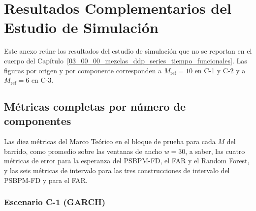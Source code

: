 \chapter{Resultados Complementarios del Estudio de Simulación}
\label{aneB_00_00_resultados_simulacion}

Este anexo reúne los resultados del estudio de simulación que no se reportan en el cuerpo del Capítulo~\ref{03_00_00_mezclas_ddp_series_tiempo_funcionales}. Las figuras por origen y por componente corresponden a $M_{\mathrm{ref}} = 10$ en C-1 y C-2 y a $M_{\mathrm{ref}} = 6$ en C-3.

\section{Métricas completas por número de componentes}
\label{aneB_00_01_metricas_por_M}

Las diez métricas del Marco Teórico en el bloque de prueba para cada $M$ del barrido, como promedio sobre las ventanas de ancho $w = 30$, a saber, las cuatro métricas de error para la esperanza del PSBPM-FD, el FAR y el Random Forest, y las seis métricas de intervalo para las tres construcciones de intervalo del PSBPM-FD y para el FAR.

\subsection{Escenario C-1 (GARCH)}
\label{aneB_00_01_02_metricas_garch}

